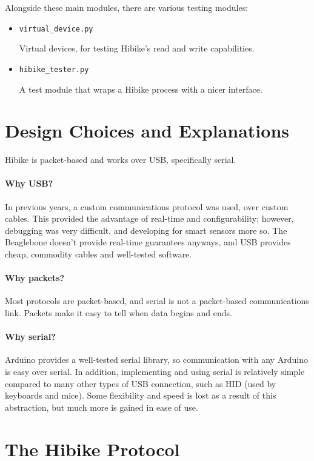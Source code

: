 \documentclass[12pt]{book}
\begin{document}
Alongside these main modules, there are various testing modules:
\begin{itemize}
	\item \texttt{virtual\_device.py}

	Virtual devices, for testing Hibike's read and write capabilities.
	\item \texttt{hibike\_tester.py}

	A test module that wraps a Hibike process with a nicer interface.
\end{itemize}

\section{Design Choices and Explanations}
Hibike is packet-based and works over USB, specifically serial.

\paragraph{Why USB?}

In previous years, a custom communications protocol was used, over custom cables.
This provided the advantage of real-time and configurability; however, debugging was very difficult,
and developing for smart sensors more so. The Beaglebone doesn't provide real-time guarantees
anyways, and USB provides cheap, commodity cables and well-tested software.

\paragraph{Why packets?}

Most protocols are packet-based, and serial is not a packet-based communications link.
Packets make it easy to tell when data begins and ends.

\paragraph{Why serial?}

Arduino provides a well-tested serial library, so communication with any Arduino is easy
over serial. In addition, implementing and using serial is relatively simple compared
to many other types of USB connection, such as HID (used by keyboards and mice). Some
flexibility and speed is lost as a result of this abstraction, but much more is gained
in ease of use.

\section{The Hibike Protocol}
\end{document}
